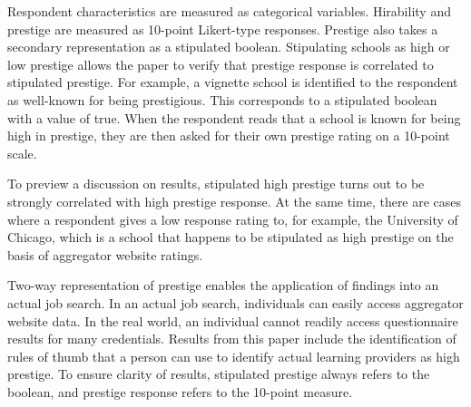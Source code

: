 \documentclass[review]{elsarticle}
\begin{document}

Respondent characteristics are measured as categorical variables.
Hirability and prestige are measured as 10-point Likert-type responses.
Prestige also takes a secondary representation as a stipulated boolean.
Stipulating schools as high or low prestige allows the paper to verify
that prestige response is correlated to stipulated prestige.
For example, a vignette school is identified to the respondent as well-known for being prestigious.
This corresponds to a stipulated boolean with a value of true.
When the respondent reads that a school is known for being high in prestige,
they are then asked for their own prestige rating on a 10-point scale.

To preview a discussion on results, stipulated high prestige turns out to be strongly correlated with high prestige response.
At the same time, there are cases where a respondent gives a low response rating to,
for example, the University of Chicago,
which is a school that happens to be stipulated as high prestige on the basis of aggregator website ratings.

Two-way representation of prestige enables the application of findings into an actual job search.
In an actual job search, individuals can easily access aggregator website data.
In the real world, an individual cannot readily access questionnaire results for many credentials.
Results from this paper include the identification of rules of thumb
that a person can use to identify actual learning providers as high prestige.
To ensure clarity of results, stipulated prestige always refers to the boolean, and prestige response refers to the 10-point measure.
\end{document}
